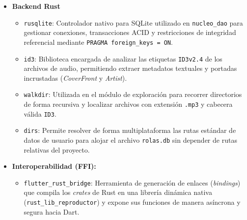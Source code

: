 \begin{itemize}
    \item \textbf{Backend Rust}
    \begin{itemize}
        \item \texttt{rusqlite}: Controlador nativo para SQLite utilizado en \texttt{nucleo\_dao} para gestionar conexiones, transacciones ACID y restricciones de integridad referencial mediante \texttt{PRAGMA foreign\_keys = ON}.
        \item \texttt{id3}: Biblioteca encargada de analizar las etiquetas \texttt{ID3v2.4} de los archivos de audio, permitiendo extraer metadatos textuales y portadas incrustadas (\textit{CoverFront} y \textit{Artist}).
        \item \texttt{walkdir}: Utilizada en el módulo de exploración para recorrer directorios de forma recursiva y localizar archivos con extensión \texttt{.mp3} y cabecera válida \texttt{ID3}.
        \item \texttt{dirs}: Permite resolver de forma multiplataforma las rutas estándar de datos de usuario para alojar el archivo \texttt{rolas.db} sin depender de rutas relativas del proyecto.\end{itemize}

\item \textbf{Interoperabilidad (FFI):}
    \begin{itemize}
        \item \texttt{flutter\_rust\_bridge}: Herramienta de generación de enlaces (\textit{bindings}) que compila los \textit{crates} de Rust en una librería dinámica nativa (\texttt{rust\_lib\_reproductor}) y expone sus funciones de manera asíncrona y segura hacia Dart.\par
    \end{itemize}


\end{itemize}
